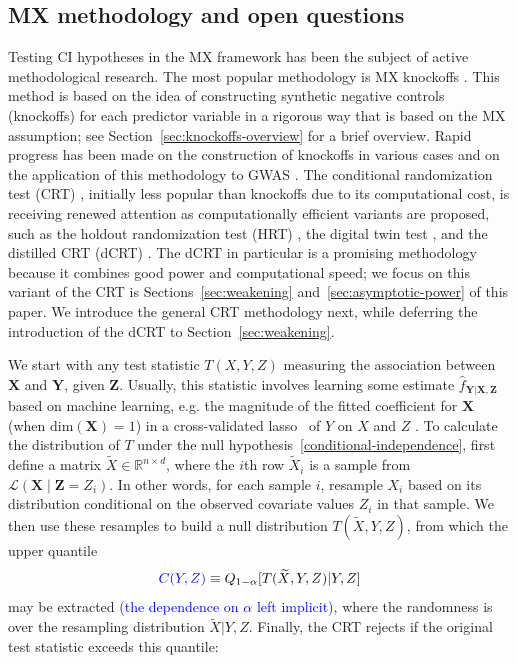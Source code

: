 \documentclass[ejs]{imsart}
\numberwithin{equation}{section}
\theoremstyle{plain}
\theoremstyle{definition}
\theoremstyle{remark}
\newcommand{\prx}{\bm X}
\newcommand{\srx}{X}
\newcommand{\prz}{\bm Z}
\newcommand{\srz}{Z}
\newcommand{\srxk}{\widetilde X}
\newcommand{\pry}{{\bm Y}}
\newcommand{\sry}{Y}
\begin{document}
\subsection{MX methodology and open questions}

Testing CI hypotheses in the MX framework has been the subject of active methodological research. The most popular methodology is MX knockoffs \cite{CetL16}. This method is based on the idea of constructing synthetic negative controls (knockoffs) for each predictor variable in a rigorous way that is based on the MX assumption; see Section~\ref{sec:knockoffs-overview} for a brief overview. Rapid progress has been made on the construction of knockoffs in various cases \cite{SetC17,Romano2019a,Bates2019,Huang2019} and on the application of this methodology to GWAS \cite{SetC17, SetS19}. The conditional randomization test (CRT) \cite{CetL16}, initially less popular than knockoffs due to its computational cost, is receiving renewed attention as computationally efficient variants are proposed, such as the holdout randomization test (HRT) \cite{Tansey2018}, the digital twin test \cite{Bates2020}, and the distilled CRT (dCRT) \cite{Liu2020}. The dCRT in particular is a promising methodology because it combines good power and computational speed; we focus on this variant of the CRT is Sections~\ref{sec:weakening} and~\ref{sec:asymptotic-power} of this paper. We introduce the general CRT methodology next, while deferring the introduction of the dCRT to Section~\ref{sec:weakening}. 

We start with any test statistic $T(\srx, \sry, \srz)$ measuring the association between $\prx$ and $\pry$, given $\prz$. Usually, this statistic involves learning some estimate $\widehat f_{\pry|\prx,\prz}$ based on machine learning, e.g. the magnitude of the fitted coefficient for $\prx$ (when $\text{dim}(\prx) = 1$) in a cross-validated lasso~\cite{T96} of $\sry$ on $\srx$ and $\srz$ \cite{CetL16}. To calculate the distribution of $T$ under the null hypothesis~\eqref{conditional-independence}, first define a matrix  $\srxk \in \mathbb R^{n \times d}$, where the $i$th row $\srxk_i$ is a sample from $\mathcal L(\prx \mid \prz = \srz_i)$. In other words, for each sample $i$, resample $\srx_i$ based on its distribution conditional on the observed covariate values $Z_i$ in that sample. We then use these resamples to build a null distribution $T(\srxk, \sry, \srz)$, from which the upper quantile
\begin{equation}
\color{blue}C(\sry,\srz)\color{black} \equiv Q_{1-\alpha}[T(\srxk, \sry, \srz)|\sry,\srz]
	\label{upper-quantile}
\end{equation}
may be extracted \textcolor{blue}{(the dependence on $\alpha$ left implicit)}, where the randomness is over the resampling distribution $\srxk |  \sry, \srz$. Finally, the CRT rejects if the original test statistic exceeds this quantile:
\end{document}
